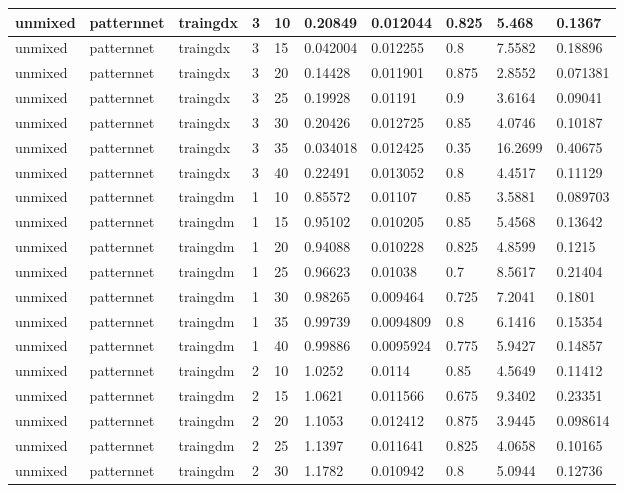 \begin{longtable}{lllllllll}
unmixed & patternnet & traingdx & 3 & 10 & 0.20849 & 0.012044 & 0.825 & 5.468 & 0.1367 \\ \hline 
unmixed & patternnet & traingdx & 3 & 15 & 0.042004 & 0.012255 & 0.8 & 7.5582 & 0.18896 \\ \hline 
unmixed & patternnet & traingdx & 3 & 20 & 0.14428 & 0.011901 & 0.875 & 2.8552 & 0.071381 \\ \hline 
unmixed & patternnet & traingdx & 3 & 25 & 0.19928 & 0.01191 & 0.9 & 3.6164 & 0.09041 \\ \hline 
unmixed & patternnet & traingdx & 3 & 30 & 0.20426 & 0.012725 & 0.85 & 4.0746 & 0.10187 \\ \hline 
unmixed & patternnet & traingdx & 3 & 35 & 0.034018 & 0.012425 & 0.35 & 16.2699 & 0.40675 \\ \hline 
unmixed & patternnet & traingdx & 3 & 40 & 0.22491 & 0.013052 & 0.8 & 4.4517 & 0.11129 \\ \hline 
unmixed & patternnet & traingdm & 1 & 10 & 0.85572 & 0.01107 & 0.85 & 3.5881 & 0.089703 \\ \hline 
unmixed & patternnet & traingdm & 1 & 15 & 0.95102 & 0.010205 & 0.85 & 5.4568 & 0.13642 \\ \hline 
unmixed & patternnet & traingdm & 1 & 20 & 0.94088 & 0.010228 & 0.825 & 4.8599 & 0.1215 \\ \hline 
unmixed & patternnet & traingdm & 1 & 25 & 0.96623 & 0.01038 & 0.7 & 8.5617 & 0.21404 \\ \hline 
unmixed & patternnet & traingdm & 1 & 30 & 0.98265 & 0.009464 & 0.725 & 7.2041 & 0.1801 \\ \hline 
unmixed & patternnet & traingdm & 1 & 35 & 0.99739 & 0.0094809 & 0.8 & 6.1416 & 0.15354 \\ \hline 
unmixed & patternnet & traingdm & 1 & 40 & 0.99886 & 0.0095924 & 0.775 & 5.9427 & 0.14857 \\ \hline 
unmixed & patternnet & traingdm & 2 & 10 & 1.0252 & 0.0114 & 0.85 & 4.5649 & 0.11412 \\ \hline 
unmixed & patternnet & traingdm & 2 & 15 & 1.0621 & 0.011566 & 0.675 & 9.3402 & 0.23351 \\ \hline 
unmixed & patternnet & traingdm & 2 & 20 & 1.1053 & 0.012412 & 0.875 & 3.9445 & 0.098614 \\ \hline 
unmixed & patternnet & traingdm & 2 & 25 & 1.1397 & 0.011641 & 0.825 & 4.0658 & 0.10165 \\ \hline 
unmixed & patternnet & traingdm & 2 & 30 & 1.1782 & 0.010942 & 0.8 & 5.0944 & 0.12736 \\ \hline 

\end{longtable}
